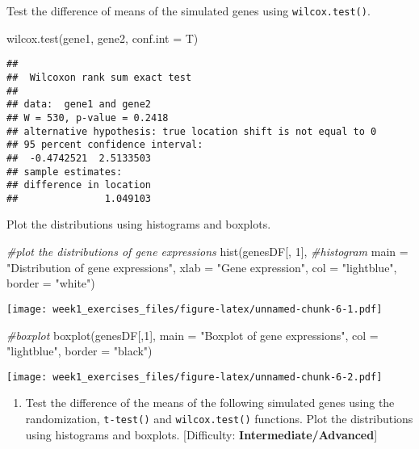 \documentclass[
]{article}
\newenvironment{Shaded}{\begin{snugshade}}{\end{snugshade}}
\newcommand{\AttributeTok}[1]{\textcolor[rgb]{0.77,0.63,0.00}{#1}}
\newcommand{\CommentTok}[1]{\textcolor[rgb]{0.56,0.35,0.01}{\textit{#1}}}
\newcommand{\DecValTok}[1]{\textcolor[rgb]{0.00,0.00,0.81}{#1}}
\newcommand{\FunctionTok}[1]{\textcolor[rgb]{0.00,0.00,0.00}{#1}}
\newcommand{\NormalTok}[1]{#1}
\newcommand{\StringTok}[1]{\textcolor[rgb]{0.31,0.60,0.02}{#1}}
\providecommand{\tightlist}{%
  \setlength{\itemsep}{0pt}\setlength{\parskip}{0pt}}
\begin{document}
Test the difference of means of the simulated genes using
\texttt{wilcox.test()}.

\begin{Shaded}
\begin{Highlighting}[]
\FunctionTok{wilcox.test}\NormalTok{(gene1, gene2, }\AttributeTok{conf.int =}\NormalTok{ T)}
\end{Highlighting}
\end{Shaded}

\begin{verbatim}
## 
##  Wilcoxon rank sum exact test
## 
## data:  gene1 and gene2
## W = 530, p-value = 0.2418
## alternative hypothesis: true location shift is not equal to 0
## 95 percent confidence interval:
##  -0.4742521  2.5133503
## sample estimates:
## difference in location 
##               1.049103
\end{verbatim}

Plot the distributions using histograms and boxplots.

\begin{Shaded}
\begin{Highlighting}[]
\CommentTok{\#plot the distributions of gene expressions}
\FunctionTok{hist}\NormalTok{(genesDF[, }\DecValTok{1}\NormalTok{], }\CommentTok{\#histogram}
     \AttributeTok{main =} \StringTok{"Distribution of gene expressions"}\NormalTok{,}
     \AttributeTok{xlab =} \StringTok{"Gene expression"}\NormalTok{,}
     \AttributeTok{col =} \StringTok{"lightblue"}\NormalTok{, }\AttributeTok{border =} \StringTok{"white"}\NormalTok{)}
\end{Highlighting}
\end{Shaded}

\texttt{[image: week1\_exercises\_files/figure-latex/unnamed-chunk-6-1.pdf]}

\begin{Shaded}
\begin{Highlighting}[]
\CommentTok{\#boxplot}
\FunctionTok{boxplot}\NormalTok{(genesDF[,}\DecValTok{1}\NormalTok{],}
     \AttributeTok{main =} \StringTok{"Boxplot of gene expressions"}\NormalTok{,}
     \AttributeTok{col =} \StringTok{"lightblue"}\NormalTok{, }\AttributeTok{border =} \StringTok{"black"}\NormalTok{)}
\end{Highlighting}
\end{Shaded}

\texttt{[image: week1\_exercises\_files/figure-latex/unnamed-chunk-6-2.pdf]}

\begin{enumerate}
\def\labelenumi{\arabic{enumi}.}
\setcounter{enumi}{1}
\tightlist
\item
  Test the difference of the means of the following simulated genes
  using the randomization, \texttt{t-test()} and \texttt{wilcox.test()}
  functions. Plot the distributions using histograms and boxplots.
  {[}Difficulty: \textbf{Intermediate/Advanced}{]}
\end{enumerate}
\end{document}
